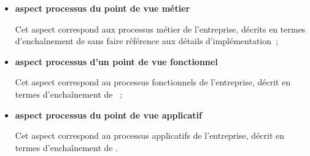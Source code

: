 \begin{itemize}

    \item \textbf{aspect processus du point de vue métier}

Cet aspect correspond aux processus métier de l'entreprise, décrits en termes
d’enchaînement de  sans faire référence aux détails d'implémentation~;

    \item \textbf{aspect processus d'un point de vue fonctionnel}

Cet aspect correspond au processus fonctionnels de l'entreprise, décrit en termes
d'enchaînement de ~;

    \item \textbf{aspect processus du point de vue applicatif}

Cet aspect correspond au processus applicatifs de l'entreprise, décrit en termes
d'enchaînement de .

\end{itemize}

